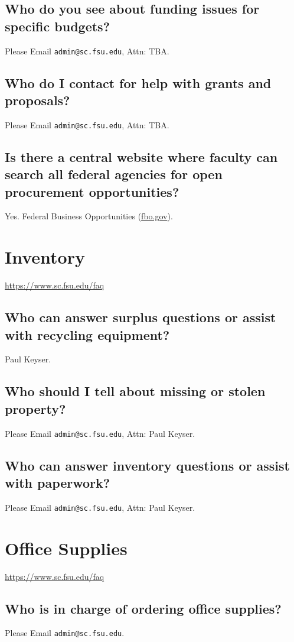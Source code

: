 \documentclass[12pt,a4paper]{article}
\begin{document}
\subsection{Who do you see about funding issues for specific budgets?}
Please Email \texttt{admin@sc.fsu.edu}, Attn: TBA.

\subsection{Who do I contact for help with grants and proposals?}
Please Email \texttt{admin@sc.fsu.edu}, Attn: TBA.

\subsection{Is there a central website where faculty can search all federal agencies for open procurement opportunities?}
Yes. Federal Business Opportunities (\url{fbo.gov}).

\section{Inventory}
\url{https://www.sc.fsu.edu/faq}
\subsection{Who can answer surplus questions or assist with recycling equipment?}
Paul Keyser.

\subsection{Who should I tell about missing or stolen property?}
Please Email \texttt{admin@sc.fsu.edu}, Attn: Paul Keyser.

\subsection{Who can answer inventory questions or assist with paperwork?}
Please Email \texttt{admin@sc.fsu.edu}, Attn: Paul Keyser.

\section{Office Supplies}
\url{https://www.sc.fsu.edu/faq}
\subsection{Who is in charge of ordering office supplies?}
Please Email \texttt{admin@sc.fsu.edu}.
\end{document}
